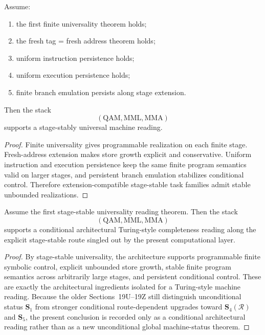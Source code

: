 \begin{theorem}\label{thm:first-stage-stable-universality-computational-layer}
Assume:
\begin{enumerate}[leftmargin=2em]
    \item the first finite universality theorem holds;
    \item the fresh tag = fresh address theorem holds;
    \item uniform instruction persistence holds;
    \item uniform execution persistence holds;
    \item finite branch emulation persists along stage extension.
\end{enumerate}
Then the stack
\[
(\mathrm{QAM},\mathrm{MML},\mathrm{MMA})
\]
supports a stage-stably universal machine reading.
\end{theorem}

\begin{proof}
Finite universality gives programmable realization on each finite stage. Fresh-address extension makes store growth explicit and conservative. Uniform instruction and execution persistence keep the same finite program semantics valid on larger stages, and persistent branch emulation stabilizes conditional control. Therefore extension-compatible stage-stable task families admit stable unbounded realizations.
\end{proof}

\begin{theorem}\label{thm:architectural-turing-style-completeness-computational-layer}
Assume the first stage-stable universality reading theorem. Then the stack
\[
(\mathrm{QAM},\mathrm{MML},\mathrm{MMA})
\]
supports a conditional architectural Turing-style completeness reading along the explicit stage-stable route singled out by the present computational layer.
\end{theorem}

\begin{proof}
By stage-stable universality, the architecture supports programmable finite symbolic control, explicit unbounded store growth, stable finite program semantics across arbitrarily large stages, and persistent conditional control. These are exactly the architectural ingredients isolated for a Turing-style machine reading. Because the older Sections~19U--19Z still distinguish unconditional status \(\mathbf S_1\) from stronger conditional route-dependent upgrades toward \(\mathbf S_4(\mathcal R)\) and \(\mathbf S_5\), the present conclusion is recorded only as a conditional architectural reading rather than as a new unconditional global machine-status theorem.
\end{proof}

